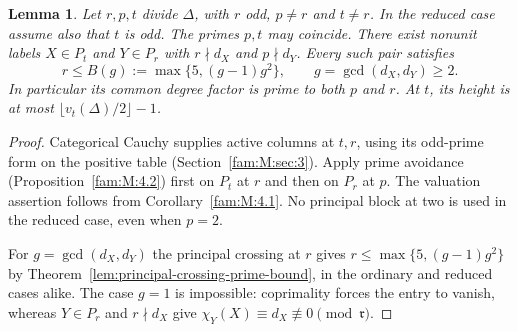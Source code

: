 \documentclass[11pt,a4paper]{article}
\numberwithin{equation}{section}
\newtheorem{lemma}[theorem]{Lemma}
\theoremstyle{remark}
\begin{document}
\begin{lemma}\label{ext:lem:two-free-crossing}
Let $r,p,t$ divide $\Delta$, with $r$ odd, $p\ne r$ and $t\ne r$.
In the reduced case assume also that $t$ is odd. The primes $p,t$ may
coincide. There exist nonunit labels $X\in P_t$ and $Y\in P_r$
with $r\nmid d_X$ and $p\nmid d_Y$. Every such pair satisfies
\[
 r\le B(g):=\max\{5,(g-1)g^2\},\qquad g=\gcd(d_X,d_Y)\ge2.
\]
In particular its common degree factor is prime to both $p$ and $r$. At $t$, its height is at most
$\lfloor v_t(\Delta)/2\rfloor-1$.
\end{lemma}
\begin{proof}
Categorical Cauchy supplies active columns at $t,r$, using its
odd-prime form on the positive table (Section~\ref{fam:M:sec:3}).
Apply prime avoidance (Proposition~\ref{fam:M:4.2}) first on $P_t$ at $r$
and then on $P_r$ at $p$. The valuation assertion follows from
Corollary~\ref{fam:M:4.1}. No principal block at two is used in the
reduced case, even when $p=2$.

For $g=\gcd(d_X,d_Y)$ the principal crossing at $r$ gives
$r\le\max\{5,(g-1)g^2\}$ by Theorem~\ref{lem:principal-crossing-prime-bound},
in the ordinary and reduced cases alike. The case $g=1$ is impossible: coprimality
forces the entry to vanish, whereas $Y\in P_r$ and $r\nmid d_X$
give $\chi_Y(X)\equiv d_X\not\equiv0\pmod{\mathfrak r}$.

\end{proof}
\end{document}
